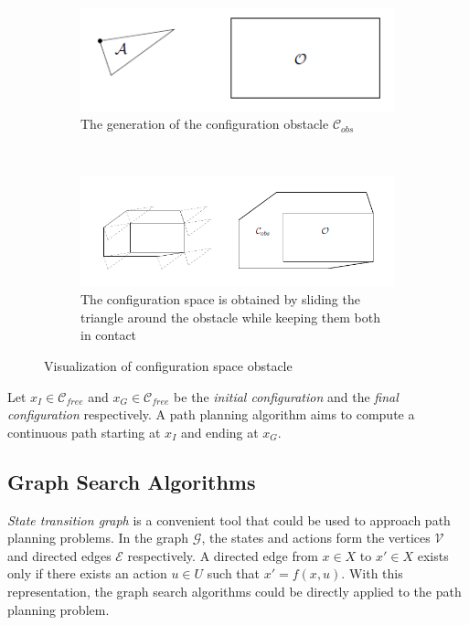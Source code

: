 \begin{figure}
    \centering
    \begin{subfigure}[b]{0.45\textwidth}
        \includegraphics[width=\textwidth]{./images/conf_space_1}
		\caption{The generation of the configuration obstacle $\mathcal{C}_{obs}$}
        \label{fig:conf_1}
    \end{subfigure}
    ~\begin{subfigure}[b]{0.45\textwidth}
        \includegraphics[width=\textwidth]{./images/conf_space_2}
		\caption{The configuration space is obtained by sliding the triangle around the obstacle while keeping them both in contact}
		\label{fig:conf_2}    
	\end{subfigure}
    \caption[Visualization of configuration space obstacle]{Visualization of configuration space obstacle \cite{lavalle2006planning}}
    \label{fig:conf}
\end{figure}


Let $x_I \in \mathcal{C}_{free}$ and $x_G \in \mathcal{C}_{free}$ be the \textit{initial configuration} and  the \textit{final configuration} respectively. A path planning algorithm aims to compute a continuous path starting at $x_I$ and ending at $x_G$. 

\subsection{Graph Search Algorithms}
\label{sec:graph_search_algo}
\textit{State transition graph} is a convenient tool that could be used to approach path planning problems. In the graph $\mathcal{G}$, the states and actions form the vertices $\mathcal{V}$ and directed edges $\mathcal{E}$ respectively. A directed edge  from $x\in X$ to $x'\in X$ exists only if there exists an action $u\in U$ such that $x'=f(x,u)$. With this representation, the graph search algorithms could be directly applied to the path planning problem.

